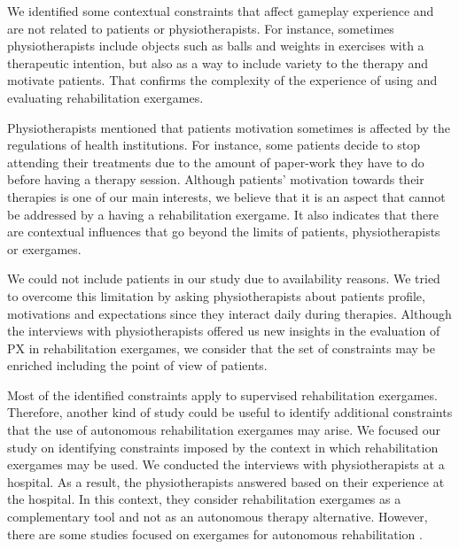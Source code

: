 We identified some contextual constraints that affect gameplay experience and are not related to patients or physiotherapists. For instance, sometimes physiotherapists include objects such as balls and weights in exercises with a therapeutic intention, but also as a way to include variety to the therapy and motivate patients. That confirms the complexity of the experience of using and evaluating rehabilitation exergames.

Physiotherapists mentioned that patients motivation sometimes is affected by the regulations of health institutions. For instance, some patients decide to stop attending their treatments due to the amount of paper-work they have to do before having a therapy session. Although patients' motivation towards their therapies is one of our main interests, we believe that it is an aspect that cannot be addressed by a having a rehabilitation exergame. It also indicates that there are contextual influences that go beyond the limits of patients, physiotherapists or exergames.
 
We could not include patients in our study due to availability reasons. We tried to overcome this limitation by asking physiotherapists about patients profile, motivations and expectations since they interact daily during therapies. Although the interviews with physiotherapists offered us new insights in the evaluation of \ac{PX} in rehabilitation exergames, we consider that the set of constraints may be enriched including the point of view of patients.

Most of the identified constraints apply to supervised rehabilitation exergames. Therefore, another kind of study could be useful to identify additional constraints that the use of autonomous rehabilitation exergames may arise. We focused our study on identifying constraints imposed by the context in which rehabilitation exergames may be used. We conducted the interviews with physiotherapists at a hospital. As a result, the physiotherapists answered based on their experience at the hospital. In this context, they consider rehabilitation exergames as a complementary tool and not as an autonomous therapy alternative. However, there are some studies focused on exergames for autonomous rehabilitation \autocite{PirovanoAdvisor2012}.



